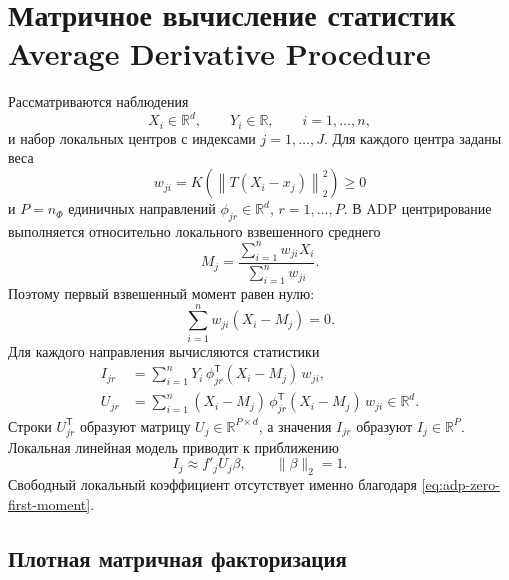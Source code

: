 
\section{Матричное вычисление статистик Average Derivative Procedure}
\label{sec:adp-matrix-statistics}

Рассматриваются наблюдения
\[
X_i\in\mathbb R^d,\qquad Y_i\in\mathbb R,
\qquad i=1,\ldots,n,
\]
и набор локальных центров с индексами $j=1,\ldots,J$. Для каждого центра заданы веса
\[
w_{ji}=K\!\left(\left\|T(X_i-x_j)\right\|_2^2\right)\geq 0
\]
и $P=n_{\Phi}$ единичных направлений
$\phi_{jr}\in\mathbb R^d$, $r=1,\ldots,P$.
В ADP центрирование выполняется относительно локального взвешенного среднего
\begin{equation}
M_j=
\frac{\sum_{i=1}^n w_{ji}X_i}
     {\sum_{i=1}^n w_{ji}}.
\label{eq:adp-local-mean}
\end{equation}
Поэтому первый взвешенный момент равен нулю:
\begin{equation}
\sum_{i=1}^n w_{ji}(X_i-M_j)=0.
\label{eq:adp-zero-first-moment}
\end{equation}
Для каждого направления вычисляются статистики
\begin{align}
I_{jr}
&=
\sum_{i=1}^n
Y_i\,\phi_{jr}^{\mathsf T}(X_i-M_j)\,w_{ji},
\label{eq:adp-I-direct}
\\
U_{jr}
&=
\sum_{i=1}^n
(X_i-M_j)\,\phi_{jr}^{\mathsf T}(X_i-M_j)\,w_{ji}
\in\mathbb R^d.
\label{eq:adp-U-direct}
\end{align}
Строки $U_{jr}^{\mathsf T}$ образуют матрицу
$U_j\in\mathbb R^{P\times d}$, а значения $I_{jr}$ образуют
$I_j\in\mathbb R^P$. Локальная линейная модель приводит к приближению
\[
I_j\approx f'_jU_j\beta,
\qquad \|\beta\|_2=1.
\]
Свободный локальный коэффициент отсутствует именно благодаря
\eqref{eq:adp-zero-first-moment}.

\subsection{Плотная матричная факторизация}


